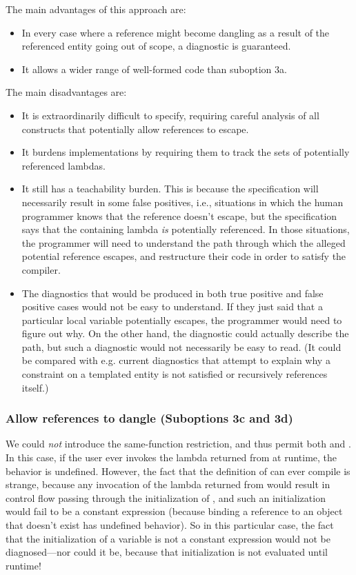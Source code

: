 \documentclass{wg21}
\begin{document}
The main advantages of this approach are:
\begin{itemize}
\item In every case where a  reference might become dangling
as a result of the referenced entity going out of scope, a diagnostic is
guaranteed.
\item It allows a wider range of well-formed code than suboption 3a.
\end{itemize}
The main disadvantages are:
\begin{itemize}
\item It is extraordinarily difficult to specify, requiring careful analysis of
all constructs that potentially allow references to escape.
\item It burdens implementations by requiring them to track the sets of
potentially referenced lambdas.
\item It still has a teachability burden. This is because the specification will
necessarily result in some false positives, i.e., situations in which the human
programmer knows that the  reference doesn't escape, but the
specification says that the containing lambda \emph{is} potentially referenced.
In those situations, the programmer will need to understand the path through
which the alleged potential reference escapes, and restructure their code in
order to satisfy the compiler.
\item The diagnostics that would be produced in both true positive and false
positive cases would not be easy to understand. If they just said that a
particular local variable potentially escapes, the programmer would need to
figure out why. On the other hand, the diagnostic could actually describe the
path, but such a diagnostic would not necessarily be easy to read. (It could be
compared with e.g. current diagnostics that attempt to explain why a constraint
on a templated entity is not satisfied or recursively references itself.)
\end{itemize}

\subsubsection{Allow  references to dangle (Suboptions 3c and 3d)}
We could \emph{not} introduce the same-function restriction, and thus permit
both  and . In this case, if the user ever invokes the
lambda returned from  at runtime, the behavior is undefined. However,
the fact that the definition of  can ever compile is strange, because
any invocation of the lambda returned from  would result in control
flow passing through the initialization of , and such an
initialization would fail to be a constant expression (because binding a
reference to an object that doesn't exist has undefined behavior). So in this
particular case, the fact that the initialization of a 
variable is not a constant expression would not be diagnosed---nor could it be,
because that initialization is not evaluated until runtime!
\end{document}
